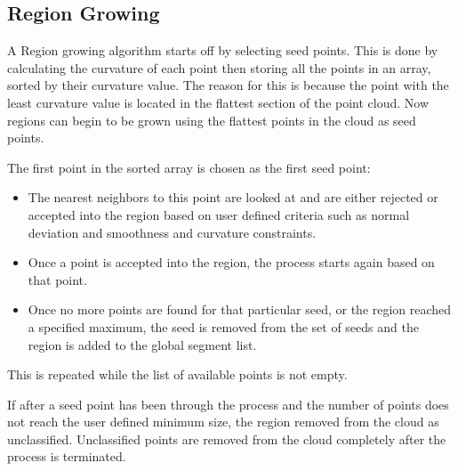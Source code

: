 				
	\subsection{Region Growing}
	
		
		A Region growing algorithm starts off by selecting seed points. This is done by calculating the curvature of each point then storing all the points in an array, sorted by their curvature value. The reason for this is because the point with the least curvature value is located in the flattest section of the point cloud. Now regions can begin to be grown using the flattest points in the cloud as seed points. 
		
		The first point in the sorted array is chosen as the first seed point:
		
		\begin{itemize}
			
			\item The nearest neighbors to this point are looked at and are either rejected or accepted into the region based on user defined criteria such as normal deviation and smoothness and curvature constraints.
			
			\item Once a point is accepted into the region, the process starts again based on that point.
			
			\item Once no more points are found for that particular seed, or the region reached a specified maximum, the seed is removed from the set of seeds and the region is added to the global segment list. 
			
		\end{itemize}
		
		This is repeated while the list of available points is not empty.
		
		If after a seed point has been through the process and the number of points does not reach the user defined minimum size, the region removed from the cloud as unclassified. Unclassified points are removed from the cloud completely after the process is terminated.
		
